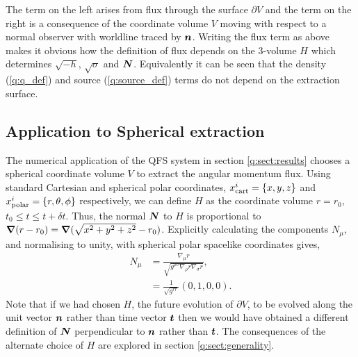 The term on the left arises from flux through the surface $\partial V$ and the term on the right is a consequence of the coordinate volume $V$ moving with respect to a normal observer with worldline traced by $\boldsymbol{n}$. Writing the flux term as above makes it obvious how the definition of flux depends on the 3-volume $H$ which determines $\sqrt{-h}$, $\sqrt{\sigma}$ and $\boldsymbol{N}$. Equivalently it can be seen that the density (\ref{q:q_def}) and source (\ref{q:source_def}) terms do not depend on the extraction surface.










\subsection{Application to Spherical extraction} \label{q:sect:sphere}
The numerical application of the QFS system in section \ref{q:sect:results} chooses a spherical coordinate volume $V$ to extract the angular momentum flux. Using standard Cartesian and spherical polar coordinates, $x^i_{\rm{cart}} = \{x,y,z\}$ and $x^i_{\rm{polar}}=\{r,\theta,\phi\}$ respectively, we can define $H$ as the coordinate volume $r=r_0$, $t_0\leq t \leq t+\delta t$. Thus, the normal $\boldsymbol{N}$ to $H$ is proportional to $\boldsymbol{\nabla}(r-r_0) = \boldsymbol{\nabla}(\sqrt{x^2 + y^2 + z^2}-r_0)$. Explicitly calculating the components $N_\mu$, and normalising to unity, with spherical polar spacelike coordinates gives,
\begin{align}
N_\mu &= \frac{\nabla_\mu r}{\sqrt{g^{\rho\sigma} \nabla_\rho r \nabla_\sigma r}}, \\
     \label{q:radial_N} &= \frac{1}{\sqrt{g^{rr}}}(0,1,0,0).
\end{align}
Note that if we had chosen $H$, the future evolution of $\partial V$, to be evolved along the unit vector $\boldsymbol{n}$ rather than time vector $\boldsymbol{t}$ then we would have obtained a different definition of $\boldsymbol{N}$ perpendicular to $\boldsymbol{n}$ rather than $\boldsymbol{t}$. The consequences of the alternate choice of $H$ are explored in section \ref{q:sect:generality}.

